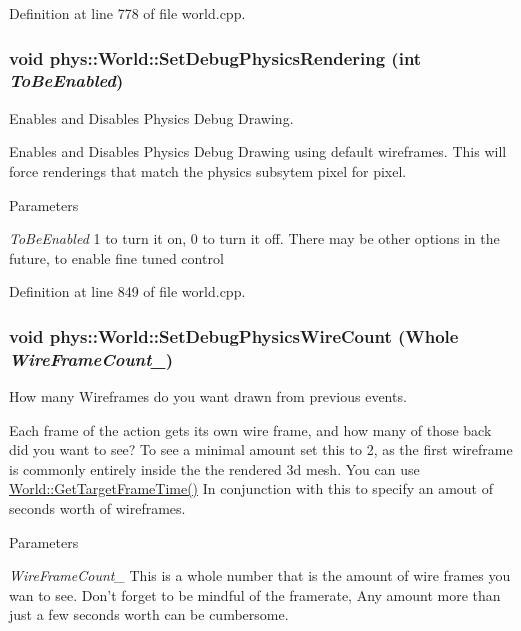 Definition at line 778 of file world.cpp.

\hypertarget{classphys_1_1World_a9fbd112d2677aa948301287d541b64bb}{
\subsubsection[{SetDebugPhysicsRendering}]{\setlength{\rightskip}{0pt plus 5cm}void phys::World::SetDebugPhysicsRendering (int {\em ToBeEnabled})}}
\label{da/ddf/classphys_1_1World_a9fbd112d2677aa948301287d541b64bb}


Enables and Disables Physics Debug Drawing. 

Enables and Disables Physics Debug Drawing using default wireframes. This will force renderings that match the physics subsytem pixel for pixel. 
\begin{DoxyParams}{Parameters}
\item[{\em ToBeEnabled}]1 to turn it on, 0 to turn it off. There may be other options in the future, to enable fine tuned control \end{DoxyParams}


Definition at line 849 of file world.cpp.

\hypertarget{classphys_1_1World_a6fa4d1e58a78ba0403af1c003fd321d9}{
\subsubsection[{SetDebugPhysicsWireCount}]{\setlength{\rightskip}{0pt plus 5cm}void phys::World::SetDebugPhysicsWireCount ({\bf Whole} {\em WireFrameCount\_\-})}}
\label{da/ddf/classphys_1_1World_a6fa4d1e58a78ba0403af1c003fd321d9}


How many Wireframes do you want drawn from previous events. 

Each frame of the action gets its own wire frame, and how many of those back did you want to see? To see a minimal amount set this to 2, as the first wireframe is commonly entirely inside the the rendered 3d mesh. You can use \hyperlink{classphys_1_1World_aa063ace52be484c7b03ec5859453f48b}{World::GetTargetFrameTime()} In conjunction with this to specify an amout of seconds worth of wireframes. 
\begin{DoxyParams}{Parameters}
\item[{\em WireFrameCount\_\-}]This is a whole number that is the amount of wire frames you wan to see. Don't forget to be mindful of the framerate, Any amount more than just a few seconds worth can be cumbersome. \end{DoxyParams}


